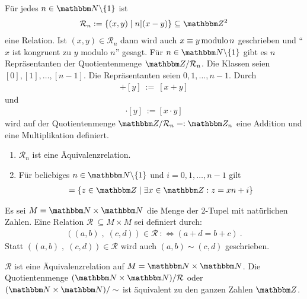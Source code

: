 \begin{Unit}[Beispiel]
  Für jedes $n \in \NN\backslash \{1\}$ ist
  \begin{align}
    \mathcal{R}_n := \{ (x,y) \mid n|(x-y) \} \subseteq \ZZ^2
  \end{align}
  eine Relation. Ist $(x,y) \in \mathcal{R}_n$ dann wird auch $x \equiv y 
  \operatorname{modulo} n$ geschrieben und \enquote{$x$ ist kongruent zu $y$ modulo $n$} 
  gesagt. Für $n \in \NN \backslash \{1\}$ gibt es $n$ Repräsentanten der
  Quotientenmenge $\ZZ /
  \mathcal{R}_n$. Die Klassen seien $[0], [1], \ldots, [n-1]$. 
  Die Repräsentanten seien $0, 1, \ldots, n-1$. Durch
  \begin{align}
    [x] + [y]\ :=\ [x + y]
  \end{align}
  und
  \begin{align}
    [x] \cdot [y]\ := [x \cdot y]
  \end{align}
  wird auf der Quotientenmenge $\ZZ / \mathcal{R}_n  =:  \ZZ_n$ eine Addition 
  und eine Multiplikation definiert.
  \begin{enumerate}
    \item $\mathcal{R}_n$ ist eine Äquivalenzrelation.
    \item Für beliebiges $n \in \NN\backslash\{1\}$ und $i=0,1,\ldots,n-1$ 
    gilt
      \begin{align}
        [i] = \{z \in \ZZ \mid \exists x \in \ZZ : z = xn + i \}
      \end{align}
  \end{enumerate}
\end{Unit}

\begin{Unit}[Beispiel]
  Es sei $M = \NN \times \NN$ die Menge der 2-Tupel mit natürlichen Zahlen. 
  Eine Relation $\mathcal{R}\ \subseteq M \times M$ sei definiert durch:
  \begin{align}
    \left( (a,b)\;,\;(c,d) \right) \in \mathcal{R}\ :\Leftrightarrow
      (a + d = b + c) \ .
  \end{align}
  Statt $\left( (a,b)\;,\;(c,d) \right) \in \mathcal{R}$ wird auch 
  $(a,b) \sim (c,d)$ geschrieben. 

  $\mathcal{R}$ ist eine Äquivalenzrelation auf $M = \NN \times \NN$. Die 
  Quotientenmenge $(\NN \times \NN) / \mathcal{R}$ oder $(\NN \times \NN) / 
  \sim$ ist äquivalent zu den ganzen Zahlen $\ZZ$.
\end{Unit}

